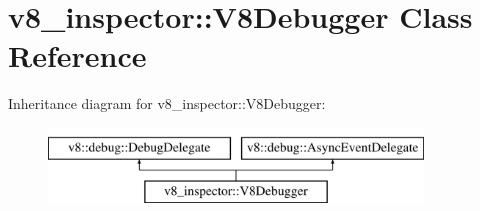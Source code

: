 \hypertarget{classv8__inspector_1_1V8Debugger}{}\section{v8\+\_\+inspector\+:\+:V8\+Debugger Class Reference}
\label{classv8__inspector_1_1V8Debugger}
Inheritance diagram for v8\+\_\+inspector\+:\+:V8\+Debugger\+:\begin{figure}[H]
\begin{center}
\leavevmode
\includegraphics[height=2.000000cm]{classv8__inspector_1_1V8Debugger}
\end{center}
\end{figure}
